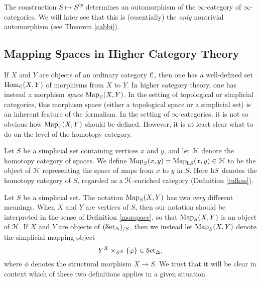 The construction $S \mapsto S^{op}$ determines an automorphism of the $\infty$-category
of $\infty$-categories. We will later see that this is (essentially) the {\em only} nontrivial automorphism
(see Theorem \ref{cabbi}).

\subsection{Mapping Spaces in Higher Category Theory}\label{prereq1}

If $X$ and $Y$ are objects of an ordinary category $\operatorname{\mathcal{C}}$, then one has a well-defined
set $\operatorname{Hom}_{\operatorname{\mathcal{C}}}(X,Y)$ of morphisms from $X$ to $Y$. In higher category theory, one has instead a morphism {\em space} $\operatorname{{Map}}_{\operatorname{\mathcal{C}}}(X,Y)$. In the setting of topological or simplicial
categories, this morphism space (either a topological space or a simplicial set) is an inherent feature of the formalism. In the setting of $\infty$-categories, it is not so obvious
how $\operatorname{{Map}}_{\operatorname{\mathcal{C}}}(X,Y)$ should be defined. However, it is at least clear what to do on the level of the homotopy category.

\begin{definition}\label{morspace}
Let $S$ be a simplicial set containing vertices $x$ and $y$, and let
$\operatorname{\mathcal{H}}$ denote the homotopy category of spaces. We define
$\operatorname{{Map}}_{S}(x,y) = \operatorname{{Map}}_{\rm{h} \it{S}}(x,y) \in \operatorname{\mathcal{H}}$ to be the object of $\operatorname{\mathcal{H}}$ representing
the space of maps from $x$ to $y$ in $S$. Here $\rm{h} \it{S}$ denotes the homotopy category of $S$, regarded as a $\operatorname{\mathcal{H}}$-enriched category (Definition \ref{tulkas}). 
\end{definition}

\begin{warning}
Let $S$ be a simplicial set. The notation $\operatorname{{Map}}_{S}( X, Y)$ has two {\em very} different meanings.
When $X$ and $Y$ are vertices of $S$, then our notation should be interpreted in the sense of Definition \ref{morspace}, so that $\operatorname{{Map}}_{S}(X,Y)$ is an object of $\operatorname{\mathcal{H}}$. If $X$ and $Y$ are objects of $(\operatorname{\mathcal{S}et_{\Delta}})_{/S}$, then we instead let $\operatorname{{Map}}_{S}(X,Y)$ denote the simplicial mapping object
$$ Y^{X} \times_{ S^{X} } \{ \varphi \} \in \operatorname{\mathcal{S}et_{\Delta}},$$
where $\phi$ denotes the structural morphism $X \rightarrow S$. We trust that it will be clear in context which of these two definitions applies in a given situation.
\end{warning}

